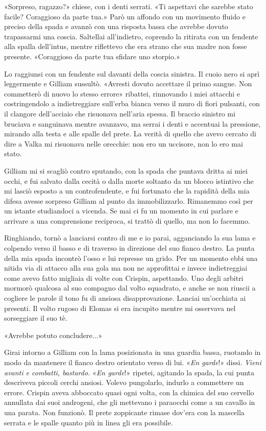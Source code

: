«Sorpreso, ragazzo?» chiese, con i denti serrati. «Ti aspettavi che
sarebbe stato facile? Coraggioso da parte tua.» Parò un affondo con un
movimento fluido e preciso della spada e avanzò con una risposta bassa
che avrebbe dovuto trapassarmi una coscia. Saltellai all'indietro,
coprendo la ritirata con un fendente alla spalla dell'intus, mentre
riflettevo che era strano che sua madre non fosse presente. «Coraggioso
da parte tua sfidare uno storpio.»

Lo raggiunsi con un fendente sul davanti della coscia sinistra. Il cuoio
nero si aprì leggermente e Gilliam sussultò. «Avresti dovuto accettare
il primo sangue. Non commetterò di nuovo lo stesso errore» ribattei,
rinnovando i miei attacchi e costringendolo a {indietreggiare} sull'erba
bianca verso il muro di fiori pulsanti, con il clangore dell'acciaio che
risuonava nell'aria spessa. Il braccio sinistro mi bruciava e sanguinava
mentre avanzavo, ma serrai i denti e accentuai la pressione, mirando
alla testa e alle spalle del prete. La verità di quello che avevo
cercato di dire a Valka mi risuonava nelle orecchie: non ero un
uccisore, non lo ero mai stato.

Gilliam mi si scagliò contro sputando, con la spada che puntava dritta
ai miei occhi, e fui salvato dalla cecità o dalla morte soltanto da un
blocco istintivo che mi lasciò esposto a un controfendente, e fui
fortunato che la rapidità della mia difesa avesse sorpreso Gilliam al
punto da immobilizzarlo. Rimanemmo così per un istante studiandoci a
vicenda. Se mai ci fu un momento in cui parlare e arrivare a una
comprensione reciproca, si trattò di quello, ma non lo facemmo.

Ringhiando, tornò a lanciarsi contro di me e io parai, agganciando la
sua lama e colpendo verso il basso e di traverso in direzione del suo
fianco destro. La punta della mia spada incontrò l'osso e lui represse
un grido. Per un momento ebbi una nitida via di attacco alla sua gola ma
non ne approfittai e invece indietreggiai come avevo fatto migliaia di
volte con Crispin, aspettando. Uno degli arbitri mormorò qualcosa al suo
compagno dal volto squadrato, e anche se non riuscii a cogliere le
parole il tono fu di ansiosa disapprovazione. Lanciai un'occhiata ai
presenti. Il volto rugoso di Elomas si era incupito mentre mi osservava
nel sorseggiare il suo tè.

«Avrebbe potuto concludere...»

Girai intorno a Gilliam con la lama posizionata in una guardia bassa,
ruotando in modo da mantenere il fianco destro orientato verso di lui.
«\emph{En garde}!» dissi. \emph{Vieni avanti e combatti, bastardo.}
«\emph{En garde}!» ripetei, agitando la spada, la cui punta descriveva
piccoli cerchi ansiosi. Volevo pungolarlo, indurlo a commettere un
errore. Crispin aveva abboccato quasi ogni volta, con la chimica del suo
cervello annullata dai suoi androgeni, che gli mettevano i paraocchi
come a un cavallo in una parata. Non funzionò. Il prete zoppicante
rimase dov'era con la mascella serrata e le spalle quanto più in linea
gli era possibile.

